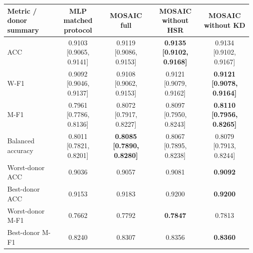 \begin{tabular}{lcccc}
\toprule
Metric / donor summary & MLP matched protocol & MOSAIC full & MOSAIC without HSR & MOSAIC without KD \\
\midrule
ACC & 0.9103 [0.9065, 0.9141] & 0.9119 [0.9086, 0.9153] & \textbf{0.9135 [0.9102, 0.9168]} & 0.9134 [0.9102, 0.9167] \\
W-F1 & 0.9092 [0.9046, 0.9137] & 0.9108 [0.9062, 0.9153] & 0.9121 [0.9079, 0.9162] & \textbf{0.9121 [0.9078, 0.9164]} \\
M-F1 & 0.7961 [0.7786, 0.8136] & 0.8072 [0.7917, 0.8227] & 0.8097 [0.7950, 0.8243] & \textbf{0.8110 [0.7956, 0.8265]} \\
Balanced accuracy & 0.8011 [0.7821, 0.8201] & \textbf{0.8085 [0.7890, 0.8280]} & 0.8067 [0.7895, 0.8238] & 0.8079 [0.7913, 0.8244] \\
Worst-donor ACC & 0.9036 & 0.9057 & 0.9081 & \textbf{0.9092} \\
Best-donor ACC & 0.9153 & 0.9183 & 0.9200 & \textbf{0.9200} \\
Worst-donor M-F1 & 0.7662 & 0.7792 & \textbf{0.7847} & 0.7813 \\
Best-donor M-F1 & 0.8240 & 0.8307 & 0.8356 & \textbf{0.8360} \\
\bottomrule
\end{tabular}
